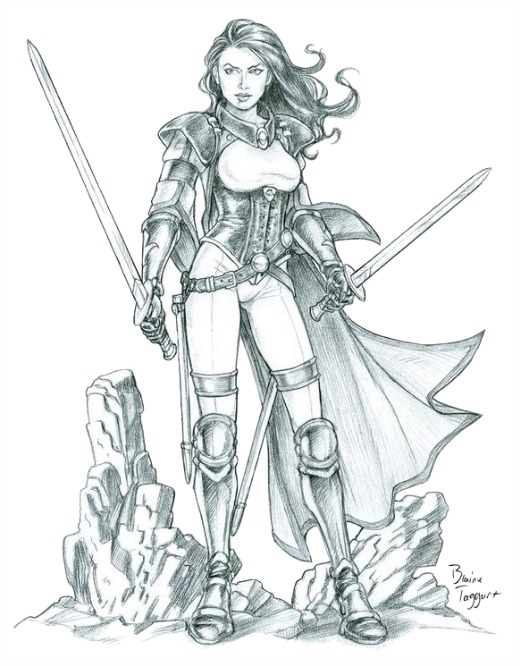 \begin{multicols*}{2}
\begin{Figure}
\centering
\includegraphics[width=\textwidth]{img/thief-2.png}
\end{Figure}
    
\end{multicols*}